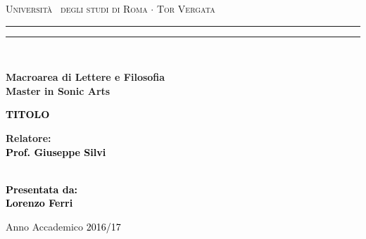 \documentclass[12pt,a4paper]{report}
\begin{document}
\begin{titlepage}
\begin{center}
{\Large{\textsc{Universit\`a  degli studi di Roma $\cdot$ Tor Vergata}}} 
\rule[0.1cm]{15.8cm}{0.1mm}
\rule[0.5cm]{15.8cm}{0.6mm}
\\\vspace{3mm}

{\small{\bf Macroarea di Lettere e Filosofia \\ Master in Sonic Arts}}

\end{center}

\vspace{23mm}

\begin{center}
\begin{spacing}{1.7}
\textcolor{black}{
\linespread{5}
{\LARGE{\bf 
TITOLO
}}}

\end{spacing}
\end{center}

\vspace{50mm} \par \noindent

\begin{minipage}[t]{0.47\textwidth}

{\large{\bf Relatore: \vspace{2mm}\\\textcolor{black}{
Prof. Giuseppe Silvi}\\\\

}
}
\end{minipage}
%
\hfill
%
\begin{minipage}[t]{0.47\textwidth}\raggedleft \textcolor{black}{
{\large{\bf Presentata da: \\
\vspace{2mm}
%
%
Lorenzo Ferri}}}
\end{minipage}

\vspace{17mm}

\begin{center}

{\large{%

Anno Accademico \textcolor{black}{2016/17}}}
\end{center}

\newpage\null\thispagestyle{empty}

\end{titlepage}
\end{document}
